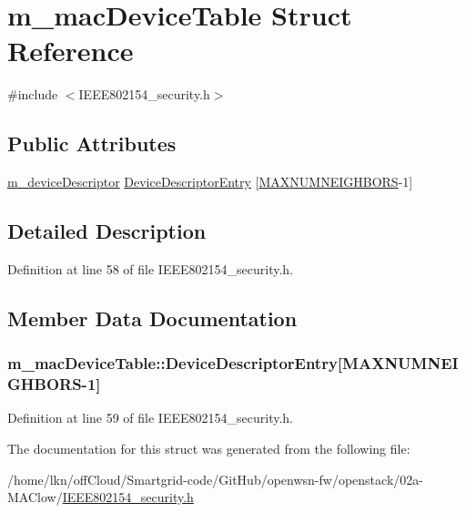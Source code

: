 \hypertarget{structm__mac_device_table}{}\section{m\+\_\+mac\+Device\+Table Struct Reference}
\label{structm__mac_device_table}


{\ttfamily \#include $<$I\+E\+E\+E802154\+\_\+security.\+h$>$}

\subsection*{Public Attributes}
\begin{DoxyCompactItemize}
\item 
\hyperlink{structm__device_descriptor}{m\+\_\+device\+Descriptor} \hyperlink{structm__mac_device_table_abf8f464894e7829f9e4009c559dc2e3f}{Device\+Descriptor\+Entry} \mbox{[}\hyperlink{group___neighbors_gaf83606573bb704d34705b540c226a0d9}{M\+A\+X\+N\+U\+M\+N\+E\+I\+G\+H\+B\+O\+RS}-\/1\mbox{]}
\end{DoxyCompactItemize}


\subsection{Detailed Description}


Definition at line 58 of file I\+E\+E\+E802154\+\_\+security.\+h.



\subsection{Member Data Documentation}
\subsubsection[{\texorpdfstring{Device\+Descriptor\+Entry}{DeviceDescriptorEntry}}]{ m\+\_\+mac\+Device\+Table\+::\+Device\+Descriptor\+Entry\mbox{[}{\bf M\+A\+X\+N\+U\+M\+N\+E\+I\+G\+H\+B\+O\+RS}-\/1\mbox{]}}\hypertarget{structm__mac_device_table_abf8f464894e7829f9e4009c559dc2e3f}{}\label{structm__mac_device_table_abf8f464894e7829f9e4009c559dc2e3f}


Definition at line 59 of file I\+E\+E\+E802154\+\_\+security.\+h.



The documentation for this struct was generated from the following file\+:\begin{DoxyCompactItemize}
\item 
/home/lkn/off\+Cloud/\+Smartgrid-\/code/\+Git\+Hub/openwsn-\/fw/openstack/02a-\/\+M\+A\+Clow/\hyperlink{_i_e_e_e802154__security_8h}{I\+E\+E\+E802154\+\_\+security.\+h}\end{DoxyCompactItemize}

